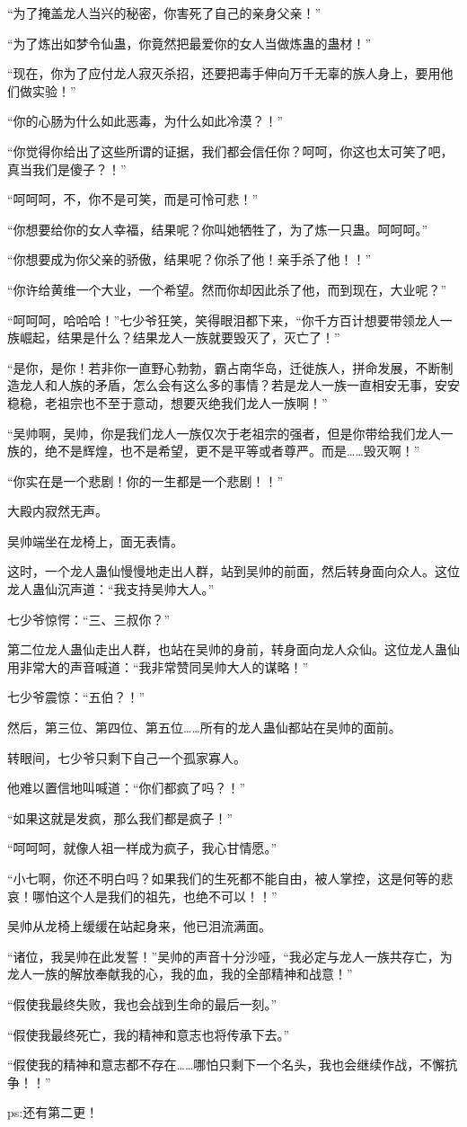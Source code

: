 \begin{this_body}
“为了掩盖龙人当兴的秘密，你害死了自己的亲身父亲！”

“为了炼出如梦令仙蛊，你竟然把最爱你的女人当做炼蛊的蛊材！”

“现在，你为了应付龙人寂灭杀招，还要把毒手伸向万千无辜的族人身上，要用他们做实验！”

“你的心肠为什么如此恶毒，为什么如此冷漠？！”

“你觉得你给出了这些所谓的证据，我们都会信任你？呵呵，你这也太可笑了吧，真当我们是傻子？！”

“呵呵呵，不，你不是可笑，而是可怜可悲！”

“你想要给你的女人幸福，结果呢？你叫她牺牲了，为了炼一只蛊。呵呵呵。”

“你想要成为你父亲的骄傲，结果呢？你杀了他！亲手杀了他！！”

“你许给黄维一个大业，一个希望。然而你却因此杀了他，而到现在，大业呢？”

“呵呵呵，哈哈哈！”七少爷狂笑，笑得眼泪都下来，“你千方百计想要带领龙人一族崛起，结果是什么？结果龙人一族就要毁灭了，灭亡了！”

“是你，是你！若非你一直野心勃勃，霸占南华岛，迁徙族人，拼命发展，不断制造龙人和人族的矛盾，怎么会有这么多的事情？若是龙人一族一直相安无事，安安稳稳，老祖宗也不至于意动，想要灭绝我们龙人一族啊！”

“吴帅啊，吴帅，你是我们龙人一族仅次于老祖宗的强者，但是你带给我们龙人一族的，绝不是辉煌，也不是希望，更不是平等或者尊严。而是……毁灭啊！”

“你实在是一个悲剧！你的一生都是一个悲剧！！”

大殿内寂然无声。

吴帅端坐在龙椅上，面无表情。

这时，一个龙人蛊仙慢慢地走出人群，站到吴帅的前面，然后转身面向众人。这位龙人蛊仙沉声道：“我支持吴帅大人。”

七少爷惊愕：“三、三叔你？”

第二位龙人蛊仙走出人群，也站在吴帅的身前，转身面向龙人众仙。这位龙人蛊仙用非常大的声音喊道：“我非常赞同吴帅大人的谋略！”

七少爷震惊：“五伯？！”

然后，第三位、第四位、第五位……所有的龙人蛊仙都站在吴帅的面前。

转眼间，七少爷只剩下自己一个孤家寡人。

他难以置信地叫喊道：“你们都疯了吗？！”

“如果这就是发疯，那么我们都是疯子！”

“呵呵呵，就像人祖一样成为疯子，我心甘情愿。”

“小七啊，你还不明白吗？如果我们的生死都不能自由，被人掌控，这是何等的悲哀！哪怕这个人是我们的祖先，也绝不可以！！”

吴帅从龙椅上缓缓在站起身来，他已泪流满面。

“诸位，我吴帅在此发誓！”吴帅的声音十分沙哑，“我必定与龙人一族共存亡，为龙人一族的解放奉献我的心，我的血，我的全部精神和战意！”

“假使我最终失败，我也会战到生命的最后一刻。”

“假使我最终死亡，我的精神和意志也将传承下去。”

“假使我的精神和意志都不存在……哪怕只剩下一个名头，我也会继续作战，不懈抗争！！”

ps:还有第二更！

\end{this_body}

